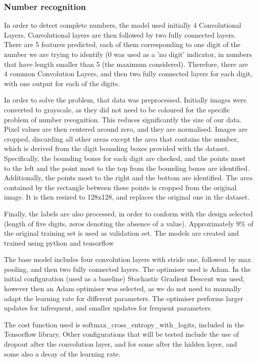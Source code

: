 \documentclass[final,12p,times]{elsarticle}
\begin{document}
\begin{Itemize}
\subsubsection{Number recognition}
\label{sec:4.2.1}
In order to detect complete numbers, the model used initially 4 Convolutional Layers.
Convolutional layers are then followed by two fully connected layers.
There are 5 features predicted, each of them corresponding to one digit of the number we are trying to identify (0 was used as 
a 'no digit' indicator, in numbers that have length smaller than 5 (the maximum considered).
Therefore, there are 4 common Convolution Layers, and then two fully connected layers for each digit, with one output for 
each of the digits.

In order to solve the problem, that data was preprocessed.
Initially images were converted to grayscale, as they did not need to be coloured for the specific problem of number recognition.
This reduces significantly the size of our data.
Pixel values are then centered around zero, and they are normalised.
Images are cropped, discarding all other areas except the area that contains the number, which is derived from the  digit 
bounding boxes provided with the dataset.
Specifically, the bounding boxes for each digit are checked, and the points most to the left and the point most to the top
from the bounding boxes are identified.
Additionally, the points most to the right and the bottom are identified.
The area contained by the rectangle between these points is cropped from the original image.
It is then resized to 128x128, and replaces the original one in the dataset.

Finally, the labels are also processed, in order to conform with the design selected (length of five digits, 
zeros denoting the absence of a value).
Approximately 9\% of the original training set is used as validation set.
The models are created and trained using python \cite{python} and tensorflow \cite{45166}

The base model includes four convolution layers with stride one, followed by max pooling, and then two fully connected layers.
The optimiser used is Adam.
In the initial configuration (used as a baseline) Stochastic Gradient Descent was used, however then an Adam optimiser was 
selected, as we do not need to manually adapt the learning rate for different parameters.
The optimiser performs larger updates for infrequent, and smaller updates for frequent parameters.

The cost function used is softmax\_cross\_entropy\_with\_logits, included in the Tensorflow library.
Other configurations that will be tested include the use of dropout \cite{Srivastava2014} after the convolution layer, and for 
some after the hidden layer, and some also a decay of the learning rate.


\end{Itemize}
\end{document}
